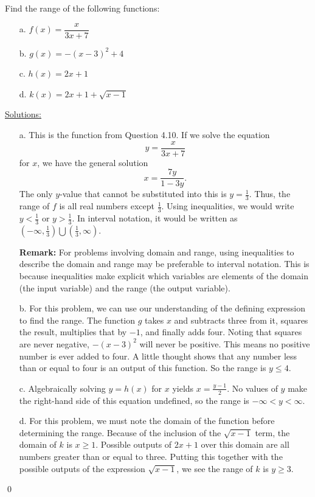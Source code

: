 \begin{eg} Find the range of the following functions:
\begin{enumerate}
\item[a.] $f(x) = \dfrac{x}{3x+7}$
\item[b.] $g(x) = -(x-3)^2 + 4$
\item[c.] $h(x) = 2x+1$
\item[d.] $k(x) = 2x+1 + \sqrt{x-1}$
\end{enumerate}
\underline{Solutions:} 
\begin{enumerate}
\item[a.] This is the function from Question 4.10. If we solve the equation
\[y = \frac{x}{3x+7}\]
for $x$, we have the general solution
\[
x = \frac{7y}{1-3y}.
\]
The only $y$-value that cannot be substituted into this is $y=\frac{1}{3}$. Thus, the range of $f$ is all real numbers except $\frac{1}{3}$. Using inequalities, we would write $y<\frac{1}{3}$ or $y>\frac{1}{3}$. In interval notation, it would be written as $\left(-\infty,\frac{1}{3}\right)\bigcup\left(\frac{1}{3},\infty\right)$. 

\par

{\bf Remark:} For problems involving domain and range, using inequalities to describe the domain and range may be preferable to interval notation. This is because inequalities make explicit which variables are elements of the domain (the input variable) and the range (the output variable).

\item[b.] For this problem, we can use our understanding of the defining expression to find the range. The function $g$ takes $x$ and subtracts three from it, squares the result, multiplies that by $-1$, and finally adds four. Noting that squares are never negative, $-(x-3)^2$ will never be positive. This means no positive number is ever added to four. A little thought shows that any number less than or equal to four is an output of this function. So the range is $y\leq 4$.

\item[c.] Algebraically solving $y=h(x)$ for $x$ yields $x = \frac{y-1}{2}$. No values of $y$ make the right-hand side of this equation undefined, so the range is $-\infty < y < \infty$.

\item[d.] For this problem, we must note the domain of the function before determining the range. Because of the inclusion of the $\sqrt{x-1}$ term, the domain of $k$ is $x\geq 1$. Possible outputs of $2x+1$ over this domain are all numbers greater than or equal to three. Putting this together with the possible outputs of the expression $\sqrt{x-1}$, we see the range of $k$ is $y\geq 3$.
\end{enumerate}
\qed \end{eg}  

